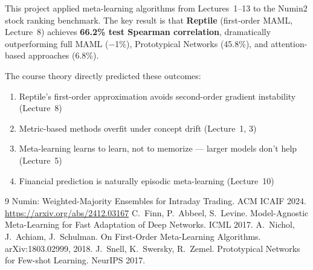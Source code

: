 \documentclass[11pt,a4paper]{article}
\begin{document}
This project applied meta-learning algorithms from Lectures~1--13 to the Numin2 stock ranking benchmark. The key result is that \textbf{Reptile} (first-order MAML, Lecture~8) achieves \textbf{66.2\% test Spearman correlation}, dramatically outperforming full MAML ($-$1\%), Prototypical Networks (45.8\%), and attention-based approaches (6.8\%).

The course theory directly predicted these outcomes:
\begin{enumerate}[nosep]
    \item Reptile's first-order approximation avoids second-order gradient instability (Lecture~8)
    \item Metric-based methods overfit under concept drift (Lecture~1, 3)
    \item Meta-learning learns to learn, not to memorize --- larger models don't help (Lecture~5)
    \item Financial prediction is naturally episodic meta-learning (Lecture~10)
\end{enumerate}

\begin{thebibliography}{9}
 Numin: Weighted-Majority Ensembles for Intraday Trading. ACM ICAIF 2024. \url{https://arxiv.org/abs/2412.03167}
 C.~Finn, P.~Abbeel, S.~Levine. Model-Agnostic Meta-Learning for Fast Adaptation of Deep Networks. ICML 2017.
 A.~Nichol, J.~Achiam, J.~Schulman. On First-Order Meta-Learning Algorithms. arXiv:1803.02999, 2018.
 J.~Snell, K.~Swersky, R.~Zemel. Prototypical Networks for Few-shot Learning. NeurIPS 2017.
\end{thebibliography}
\end{document}
